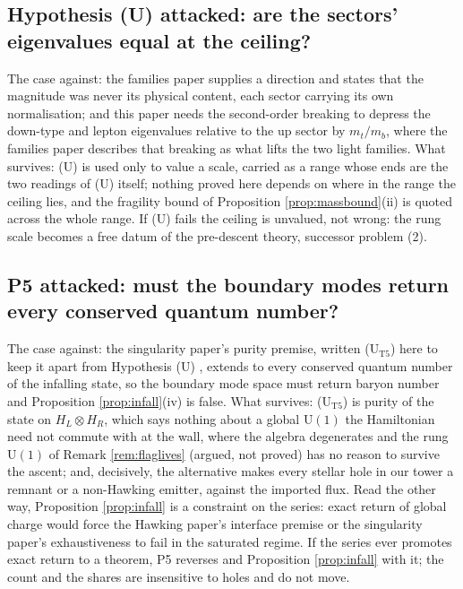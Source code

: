 \documentclass[11pt]{article}
\theoremstyle{definition}
\begin{document}
\subsection*{Hypothesis (U) attacked: are the sectors' eigenvalues equal at the ceiling?}

The case against: the families paper supplies a direction and states that the magnitude was never its physical content, each sector carrying its own normalisation; and this paper needs the second-order breaking to depress the down-type and lepton eigenvalues relative to the up sector by $m_{t}/m_{b}$, where the families paper describes that breaking as what lifts the two light families. What survives: (U) is used only to value a scale, carried as a range whose ends are the two readings of (U) itself; nothing proved here depends on where in the range the ceiling lies, and the fragility bound of Proposition \ref{prop:massbound}(ii) is quoted across the whole range. If (U) fails the ceiling is unvalued, not wrong: the rung scale becomes a free datum of the pre-descent theory, successor problem (2).

\subsection*{P5 attacked: must the boundary modes return every conserved quantum number?}

The case against: the singularity paper's purity premise, written (U$_{\mathrm{T5}}$) here to keep it apart from Hypothesis (U) \cite[Premise~11.3(U)]{ButlerT5}, extends to every conserved quantum number of the infalling state, so the boundary mode space must return baryon number and Proposition \ref{prop:infall}(iv) is false. What survives: (U$_{\mathrm{T5}}$) is purity of the state on $H_{L} \otimes H_{R}$, which says nothing about a global $\mathrm{U}(1)$ the Hamiltonian need not commute with at the wall, where the algebra degenerates and the rung $\mathrm{U}(1)$ of Remark \ref{rem:flaglives} (argued, not proved) has no reason to survive the ascent; and, decisively, the alternative makes every stellar hole in our tower a remnant or a non-Hawking emitter, against the imported flux. Read the other way, Proposition \ref{prop:infall} is a constraint on the series: exact return of global charge would force the Hawking paper's interface premise or the singularity paper's exhaustiveness to fail in the saturated regime. If the series ever promotes exact return to a theorem, P5 reverses and Proposition \ref{prop:infall} with it; the count and the shares are insensitive to holes and do not move.
\end{document}

